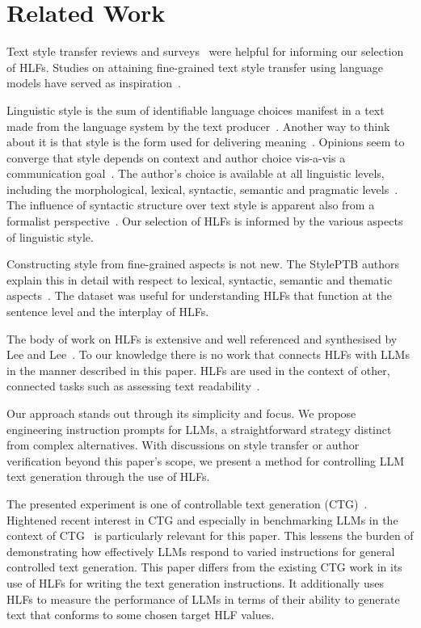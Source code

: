 \documentclass[11pt]{article}
\begin{document}
\section{Related Work}\label{related}

Text style transfer reviews and surveys~\cite{tst-review-2021,tst-survey-2022}
were helpful for informing our selection of HLFs.
Studies on attaining fine-grained text style transfer using language models
have served as inspiration~\cite{lyu-etal-2023-fine}.

Linguistic style is the sum of identifiable language choices manifest in a text
made from the language system by the text producer~\cite{lugea2023stylistics}.
Another way to think about it is that style is the form used for delivering
meaning~\cite{tst_sigkdd_review_2022}.
Opinions seem to converge that style depends on context and author choice
vis-a-vis a communication goal~\cite{mcdonald1985computational,hovy1987generating}.
The author's choice is available at all linguistic levels, including the
morphological, lexical, syntactic, semantic and pragmatic
levels~\cite{dimarco1994model,lugea2023stylistics}.
The influence of syntactic structure over text style is apparent also from a
formalist perspective~\cite{chomsky2002syntactic}.
Our selection of HLFs is informed by the various aspects of linguistic style.

Constructing style from fine-grained aspects is not new.
The StylePTB authors explain this in detail with respect to lexical,
syntactic, semantic and thematic aspects~\cite{lyu-etal-2021-styleptb}.
The dataset was useful for understanding HLFs that function at the sentence
level and the interplay of HLFs.

The body of work on HLFs is extensive and well referenced and synthesised by
Lee and Lee~\cite{lftk-2023}.
To our knowledge there is no work that connects HLFs with LLMs in the manner
described in this paper.
HLFs are used in the context of other, connected tasks such as assessing text
readability~\cite{lee-etal-2021-pushing}.

Our approach stands out through its simplicity and focus.
We propose engineering instruction prompts for LLMs, a straightforward strategy
distinct from complex alternatives.
With discussions on style transfer or author verification beyond this paper's
scope, we present a method for controlling LLM text generation through the use
of HLFs.

The presented experiment is one of controllable text
generation (CTG)~\cite{zhang-ctg-2022}.
Hightened recent interest in CTG and especially in benchmarking LLMs in the
context of CTG~\cite{chen2024benchmarking} is particularly relevant for this
paper.
This lessens the burden of demonstrating how effectively LLMs respond to varied
instructions for general controlled text generation.
This paper differs from the existing CTG work in its use of HLFs for writing
the text generation instructions.
It additionally uses HLFs to measure the performance of LLMs in terms of their
ability to generate text that conforms to some chosen target HLF values.
\end{document}
